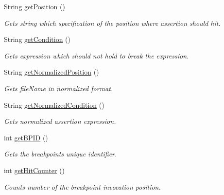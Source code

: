 \begin{DoxyCompactItemize}
\item 
String \hyperlink{classgov_1_1nasa_1_1jpf_1_1inspector_1_1server_1_1breakpoints_1_1_assert_status_impl_a61b32b639151e332af0ca481d19e0acb}{get\+Position} ()
\begin{DoxyCompactList}\small\item\em Gets string which specification of the position where assertion should hit. \end{DoxyCompactList}\item 
String \hyperlink{classgov_1_1nasa_1_1jpf_1_1inspector_1_1server_1_1breakpoints_1_1_assert_status_impl_af3a13ed39d956475b97e588e8496a87e}{get\+Condition} ()
\begin{DoxyCompactList}\small\item\em Gets expression which should not hold to break the expression. \end{DoxyCompactList}\item 
String \hyperlink{classgov_1_1nasa_1_1jpf_1_1inspector_1_1server_1_1breakpoints_1_1_assert_status_impl_a85aedde220998498ccaf96cf5a4b9316}{get\+Normalized\+Position} ()
\begin{DoxyCompactList}\small\item\em Gets file\+Name in normalized format. \end{DoxyCompactList}\item 
String \hyperlink{classgov_1_1nasa_1_1jpf_1_1inspector_1_1server_1_1breakpoints_1_1_assert_status_impl_a8f7a266eec5f8f381f306e98ec3f3bb5}{get\+Normalized\+Condition} ()
\begin{DoxyCompactList}\small\item\em Gets normalized assertion expression. \end{DoxyCompactList}\item 
int \hyperlink{classgov_1_1nasa_1_1jpf_1_1inspector_1_1server_1_1breakpoints_1_1_break_point_status_impl_a6922803b0cb927c5665ee76a9ee085c9}{get\+B\+P\+ID} ()
\begin{DoxyCompactList}\small\item\em Gets the breakpoint\textquotesingle{}s unique identifier. \end{DoxyCompactList}\item 
int \hyperlink{classgov_1_1nasa_1_1jpf_1_1inspector_1_1server_1_1breakpoints_1_1_break_point_status_impl_abf2690a7a2f643395df19c28acd2dba2}{get\+Hit\+Counter} ()
\begin{DoxyCompactList}\small\item\em Counts number of the breakpoint invocation position. \end{DoxyCompactList}\item 

\end{DoxyCompactItemize}
